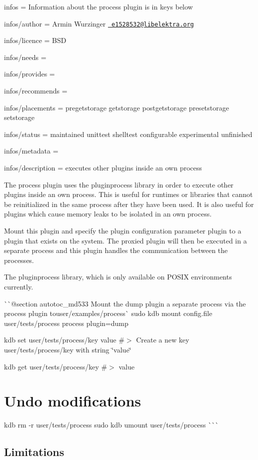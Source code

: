 
\begin{DoxyItemize}
\item infos = Information about the process plugin is in keys below
\item infos/author = Armin Wurzinger \href{mailto:e1528532@libelektra.org}{\texttt{ e1528532@libelektra.\+org}}
\item infos/licence = B\+SD
\item infos/needs =
\item infos/provides =
\item infos/recommends =
\item infos/placements = pregetstorage getstorage postgetstorage presetstorage setstorage
\item infos/status = maintained unittest shelltest configurable experimental unfinished
\item infos/metadata =
\item infos/description = executes other plugins inside an own process
\end{DoxyItemize}

The process plugin uses the {\ttfamily pluginprocess} library in order to execute other plugins inside an own process. This is useful for runtimes or libraries that cannot be reinitialized in the same process after they have been used. It is also useful for plugins which cause memory leaks to be isolated in an own process.

Mount this plugin and specify the plugin configuration parameter {\ttfamily plugin} to a plugin that exists on the system. The proxied plugin will then be executed in a separate process and this plugin handles the communication between the processes.

The {\ttfamily pluginprocess} library, which is only available on P\+O\+S\+IX environments currently.

\`{}\`{}{\ttfamily  @section autotoc\+\_\+md533 Mount the dump plugin a separate process via the process plugin to}user/examples/process\`{} sudo kdb mount config.\+file user/tests/process process plugin=dump

kdb set user/tests/process/key value \#$>$ Create a new key user/tests/process/key with string \char`\"{}value\char`\"{}

kdb get user/tests/process/key \#$>$ value\hypertarget{autotoc_md529_autotoc_md534}{}\section{Undo modifications}\label{autotoc_md529_autotoc_md534}
kdb rm -\/r user/tests/process sudo kdb umount user/tests/process \`{}\`{}\`{}\hypertarget{autotoc_md529_autotoc_md535}{}\subsection{Limitations}\label{autotoc_md529_autotoc_md535}

